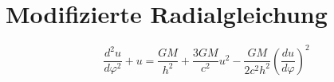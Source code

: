 \section{Modifizierte Radialgleichung}
\[ \frac{d^2u}{d\varphi^2} + u = \frac{GM}{h^2} + \frac{3GM}{c^2}u^2 - \frac{GM}{2c^2h^2}\left(\frac{du}{d\varphi}\right)^2 \]